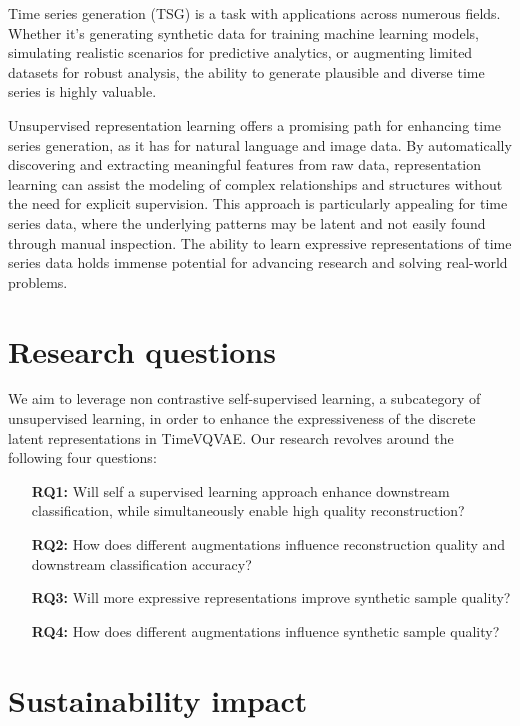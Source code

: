 \documentclass[../../thesis.tex]{subfiles}
\begin{document}
Time series generation (TSG) is a task with applications across numerous fields. Whether it's generating synthetic data for training machine learning models, simulating realistic scenarios for predictive analytics, or augmenting limited datasets for robust analysis, the ability to generate plausible and diverse time series is highly valuable.\newline

Unsupervised representation learning offers a promising path for enhancing time series generation, as it has for natural language and image data. By automatically discovering and extracting meaningful features from raw data, representation learning can assist the modeling of complex relationships and structures without the need for explicit supervision. This approach is particularly appealing for time series data, where the underlying patterns may be latent and not easily found through manual inspection. The ability to learn expressive representations of time series data holds immense potential for advancing research and solving real-world problems.


\section{Research questions}

We aim to leverage non contrastive self-supervised learning, a subcategory of unsupervised learning, in order to enhance the expressiveness of the discrete latent representations in TimeVQVAE. Our research revolves around the following four questions:
\begin{itemize}
	\item[\textbf{RQ1:}] Will self a supervised learning approach enhance downstream classification, while simultaneously enable high quality reconstruction?
	\item[\textbf{RQ2:}] How does different augmentations influence reconstruction quality and downstream classification accuracy? 
	\item[\textbf{RQ3:}] Will more expressive representations improve synthetic sample quality?
	\item[\textbf{RQ4:}] How does different augmentations influence synthetic sample quality?
\end{itemize}


\section{Sustainability impact}
\end{document}
